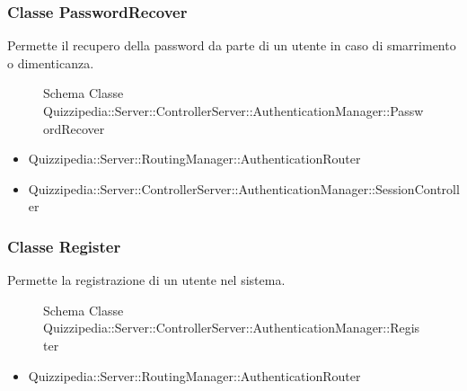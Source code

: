 \subsubsection{Classe PasswordRecover}
Permette il recupero della password da parte di un utente in caso di smarrimento o dimenticanza.
\begin{figure}[H]
\centering
\noindent{}
\caption{Schema Classe Quizzipedia::Server::ControllerServer::AuthenticationManager::PasswordRecover}
\end{figure}
\begin{itemize}
\item Quizzipedia::Server::RoutingManager::AuthenticationRouter
\end{itemize}
\begin{itemize}
\item Quizzipedia::Server::ControllerServer::AuthenticationManager::SessionController
\end{itemize}
\subsubsection{Classe Register}
Permette la registrazione di un utente nel sistema.
\begin{figure}[H]
\centering
\noindent{}
\caption{Schema Classe Quizzipedia::Server::ControllerServer::AuthenticationManager::Register}
\end{figure}
\begin{itemize}
\item Quizzipedia::Server::RoutingManager::AuthenticationRouter
\end{itemize}

